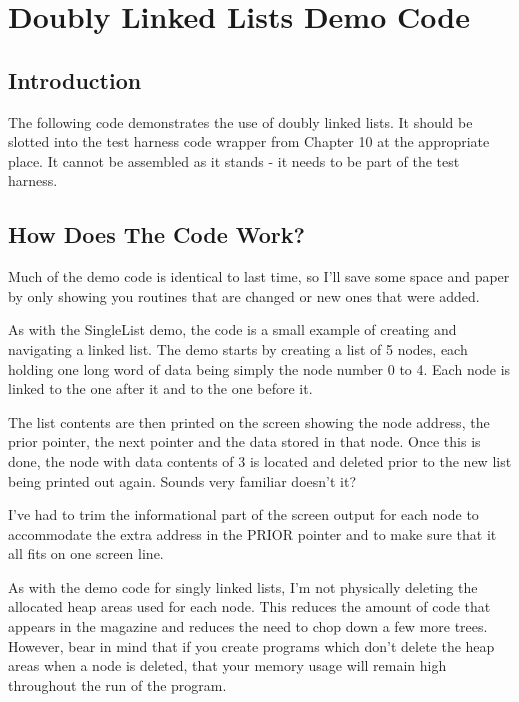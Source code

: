 \chapter{Doubly Linked Lists Demo Code}

\section{Introduction}
\label{ch12-intro}%

The following code demonstrates the use of doubly linked lists. It
    should be slotted into the test harness code wrapper from Chapter 10 at the
    appropriate place. It cannot be assembled as it stands -{} it needs to be
    part of the test harness.

\section{How Does The Code Work?}
\label{ch12-double-code}%

Much of the demo code is identical to last time, so I'll save some space and
paper by only showing you routines that are changed or new ones that were added.

As with the SingleList demo, the code is a small example of creating and navigating a
linked list. The demo starts by creating a list of 5 nodes, each holding one long word
of data being simply the node number 0 to 4. Each node is linked to the one after it and
to the one before it.

The list contents are then printed on the screen showing the node address, the prior
pointer, the next pointer and the data stored in that node. Once this is done, the node
with data contents of 3 is located and deleted prior to the new list being printed out
again. Sounds very familiar doesn't it?

I've had to trim the informational part of the screen output for each node to accommodate
the extra address in the PRIOR pointer and to make sure that it all fits on one screen
line.

As with the demo code for singly linked lists, I'm not physically deleting the allocated
heap areas used for each node. This reduces the amount of code that appears in the
magazine and reduces the need to chop down a few more trees. However, bear in mind that
if you create programs which don't delete the heap areas when a node is deleted, that
your memory usage will remain high throughout the run of the program.

